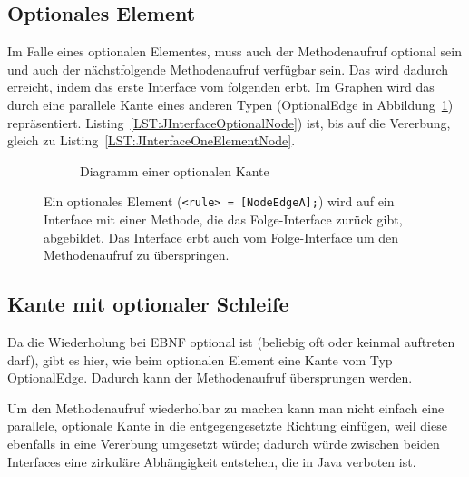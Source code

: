 \documentclass[../InterneDSLs.tex]{subfiles}
\begin{document}
\subsection{Optionales Element}\label{SEC:Optional}
Im Falle eines optionalen Elementes, muss auch der Methodenaufruf optional sein und auch der nächstfolgende Methodenaufruf verfügbar sein. Das wird dadurch erreicht, indem das erste Interface vom folgenden erbt. Im Graphen wird das durch eine parallele Kante eines anderen Typen (OptionalEdge in Abbildung~\ref{FIG:DiagramOptionalNode}) repräsentiert. Listing~\ref{LST:JInterfaceOptionalNode}) ist, bis auf die Vererbung, gleich zu Listing~\ref{LST:JInterfaceOneElementNode}.
\begin{figure}[ht]
\centering
  \begin{subfigure}[c]{0.49\textwidth}
    \caption{Diagramm einer optionalen Kante}
    \label{FIG:DiagramOptionalNode}
  \end{subfigure}
  \begin{subfigure}[c]{0.49\textwidth}
    
  \end{subfigure}
  \caption{Ein optionales Element (\texttt{<rule> = [NodeEdgeA];}) wird auf ein Interface mit einer Methode, die das Folge-Interface zurück gibt, abgebildet. Das Interface erbt auch vom Folge-Interface um den Methodenaufruf zu überspringen.}
  \label{FIG:OptionalNode}
\end{figure}

\subsection{Kante mit optionaler Schleife}\label{SEC:OptionalLoop}
Da die Wiederholung bei EBNF optional ist (beliebig oft oder keinmal auftreten darf), gibt es hier, wie beim optionalen Element eine Kante vom Typ OptionalEdge. Dadurch kann der Methodenaufruf übersprungen werden.

Um den Methodenaufruf wiederholbar zu machen kann man nicht einfach eine parallele, optionale Kante in die entgegengesetzte Richtung einfügen, weil diese ebenfalls in eine Vererbung umgesetzt würde; dadurch würde zwischen beiden Interfaces eine zirkuläre Abhängigkeit entstehen, die in Java verboten ist.
\end{document}
